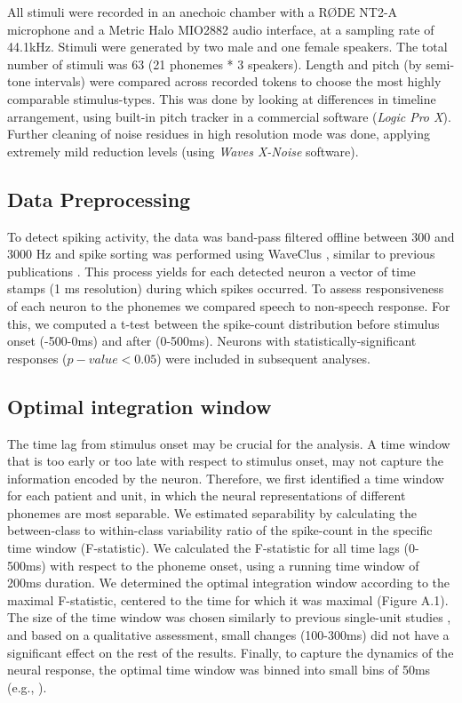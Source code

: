 All stimuli were recorded in an anechoic chamber with a RØDE NT2-A microphone and a Metric Halo MIO2882 audio interface, at a sampling rate of 44.1kHz. Stimuli were generated by two male and one female speakers. The total number of stimuli was 63 (21 phonemes * 3 speakers). Length and pitch (by semi-tone intervals) were compared across recorded tokens to choose the most highly comparable stimulus-types. This was done by looking at differences in timeline arrangement, using built-in pitch tracker in a commercial software (\textit{Logic Pro X}). Further cleaning of noise residues in high resolution mode was done, applying extremely mild reduction levels (using \textit{Waves X-Noise} software).

\subsection{Data Preprocessing}
To detect spiking activity, the data was band-pass filtered offline between 300 and 3000 Hz and spike sorting was performed using WaveClus \citep{quiroga2004unsupervised}, similar to previous publications \citep{quiroga2005invariant}. This process yields for each detected neuron a vector of time stamps (1 ms resolution) during which spikes occurred. To assess responsiveness of each neuron to the phonemes we compared speech to non-speech response. For this, we computed a t-test between the spike-count distribution before stimulus onset (-500-0ms) and after (0-500ms). Neurons with statistically-significant responses ($p-value<0.05$) were included in subsequent analyses. 

\subsection{Optimal integration window}
The time lag from stimulus onset may be crucial for the analysis. A time window that is too early or too late with respect to stimulus onset, may not capture the information encoded by the neuron. Therefore, we first identified a time window for each patient and unit, in which the neural representations of different phonemes are most separable. We estimated separability by calculating the between-class to within-class variability ratio of the spike-count in the specific time window (F-statistic). We calculated the F-statistic for all time lags (0-500ms) with respect to the phoneme onset, using a running time window of 200ms duration. We determined the optimal integration window according to the maximal F-statistic, centered to the time for which it was maximal (Figure A.1). The size of the time window was chosen similarly to previous single-unit studies \citep{cash2015emergence}, and based on a qualitative assessment, small changes (100-300ms) did not have a significant effect on the rest of the results. Finally, to capture the dynamics of the neural response, the optimal time window was binned into small bins of 50ms (e.g., \citealp{Mesgarani2014}). 

